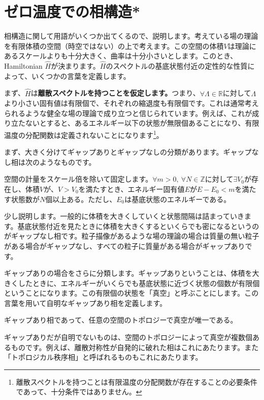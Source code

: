 \documentclass[report,paper=a4, fontsize=12pt, line_length=16cm, number_of_lines=33,dvipdfmx]{jlreq}
\newcommand{\kyou}[1]{{\sffamily \bfseries #1}}
\numberwithin{equation}{chapter}
\newcommand{\Zb}{\mathbb{Z}}
\newcommand{\Hh}{\widehat{H}}
\newcommand{\Rb}{\mathbb{R}}
\begin{document}
\section{ゼロ温度での相構造*}

相構造に関して用語がいくつか出てくるので、説明します。考えている場の理論を有限体積の空間（時空ではない）の上で考えます。この空間の体積$V$は理論にあるスケールよりも十分大きく、曲率は十分小さいとします。このとき、Hamiltonian $\Hh$が決まります。$\Hh$のスペクトルの基底状態付近の定性的な性質によって、いくつかの言葉を定義します。

まず、$\Hh$は\kyou{離散スペクトルを持つことを仮定します。}つまり、$\forall \Lambda\in \Rb$に対して$\Lambda$より小さい固有値は有限個で、それぞれの縮退度も有限個です。これは通常考えられるような健全な場の理論で成り立つと信じられています。例えば、これが成り立たないとすると、あるエネルギー以下の状態が無限個あることになり、有限温度の分配関数は定義されないことになります\footnote{離散スペクトルを持つことは有限温度の分配関数が存在することの必要条件であって、十分条件ではありません。}。

まず、大きく分けてギャップありとギャップなしの分類があります。ギャップなし相は次のようなものです。
\begin{proposition}[ギャップなし相]
  空間の計量をスケール倍を除いて固定します。$\forall m>0,\ \forall N\in \Zb$に対して$\exists V_0$が存在し、体積$V$が、$V>V_0$を満たすとき、エネルギー固有値$E$が$E-E_0 <m$を満たす状態数が$N$個以上ある。ただし、$E_0$は基底状態のエネルギーである。
\end{proposition}
少し説明します。一般的に体積を大きくしていくと状態間隔は詰まっていきます。基底状態付近を見たときに体積を大きくするといくらでも密になるというのがギャップなし相です。粒子描像があるような場の理論の場合は質量の無い粒子がある場合がギャップなし、すべての粒子に質量がある場合がギャップありです。

ギャップありの場合をさらに分類します。ギャップありということは、体積を大きくしたときに、エネルギーがいくらでも基底状態に近づく状態の個数が有限個ということになります。この有限個の状態を「真空」と呼ぶことにします。この言葉を用いて自明なギャップあり相を定義します。
\begin{proposition}[自明なギャップあり相]
  ギャップあり相であって、任意の空間のトポロジーで真空が唯一である。  
\end{proposition}
ギャップありだが自明でないものは、空間のトポロジーによって真空が複数個あるものです。例えば、離散対称性が自発的に破れた相はこれにあたります。また「トポロジカル秩序相」と呼ばれるものもこれにあたります。
\end{document}
